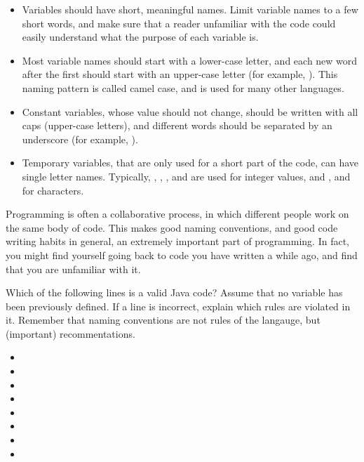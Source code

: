 \begin{itemize}
\item Variables should have short, meaningful names. Limit variable names to a few short words, and make sure that a reader unfamiliar with the code could easily understand what the purpose of each variable is. 
\item Most variable names should start with a lower-case letter, and each new word after the first should start with an upper-case letter (for example, ). This naming pattern is called camel case, and is used for many other languages.
\item Constant variables, whose value should not change, should be written with all caps (upper-case letters), and different words should be separated by an underscore (for example, ).
\item Temporary variables, that are only used for a short part of the code, can have single letter names. Typically, , , ,  and  are used for integer values, and ,  and  for characters.
\end{itemize}

Programming is often a collaborative process, in which different people work on the same body of code. This makes good naming conventions, and good code writing habits in general, an extremely important part of programming. In fact, you might find yourself going back to code you have written a while ago, and find that you are unfamiliar with it.

\exercisesection

\begin{exercise}
Which of the following lines is a valid Java code? Assume that no variable has been previously defined. If a line is incorrect, explain which rules are violated in it. Remember that naming conventions are not rules of the langauge, but (important) recommentations.
\begin{itemize}
\item {}
\item {}
\item {}
\item {}
\item {}
\item {}
\item {}
\item {}
\end{itemize}
\end{exercise}

